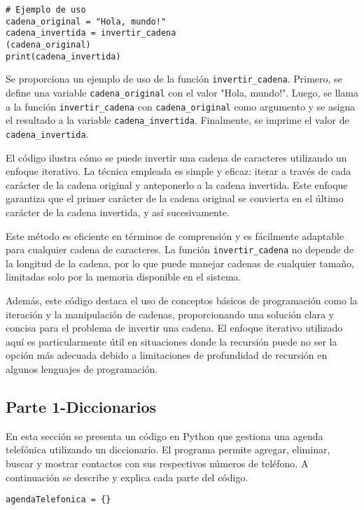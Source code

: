 \documentclass[conference]{IEEEtran}
\begin{document}
\begin{verbatim}
# Ejemplo de uso
cadena_original = "Hola, mundo!"
cadena_invertida = invertir_cadena
(cadena_original)
print(cadena_invertida)
\end{verbatim}

Se proporciona un ejemplo de uso de la función \texttt{invertir\_cadena}. Primero, se define una variable \texttt{cadena\_original} con el valor "Hola, mundo!". Luego, se llama a la función \texttt{invertir\_cadena} con \texttt{cadena\_original} como argumento y se asigna el resultado a la variable \texttt{cadena\_invertida}. Finalmente, se imprime el valor de \texttt{cadena\_invertida}.

El código ilustra cómo se puede invertir una cadena de caracteres utilizando un enfoque iterativo. La técnica empleada es simple y eficaz: iterar a través de cada carácter de la cadena original y anteponerlo a la cadena invertida. Este enfoque garantiza que el primer carácter de la cadena original se convierta en el último carácter de la cadena invertida, y así sucesivamente.

Este método es eficiente en términos de comprensión y es fácilmente adaptable para cualquier cadena de caracteres. La función \texttt{invertir\_cadena} no depende de la longitud de la cadena, por lo que puede manejar cadenas de cualquier tamaño, limitadas solo por la memoria disponible en el sistema.

Además, este código destaca el uso de conceptos básicos de programación como la iteración y la manipulación de cadenas, proporcionando una solución clara y concisa para el problema de invertir una cadena. El enfoque iterativo utilizado aquí es particularmente útil en situaciones donde la recursión puede no ser la opción más adecuada debido a limitaciones de profundidad de recursión en algunos lenguajes de programación.



\subsection{Parte 1-Diccionarios}

En esta sección se presenta un código en Python que gestiona una agenda telefónica utilizando un diccionario. El programa permite agregar, eliminar, buscar y mostrar contactos con sus respectivos números de teléfono. A continuación se describe y explica cada parte del código.

\begin{verbatim}
agendaTelefonica = {}
\end{verbatim}
\end{document}
